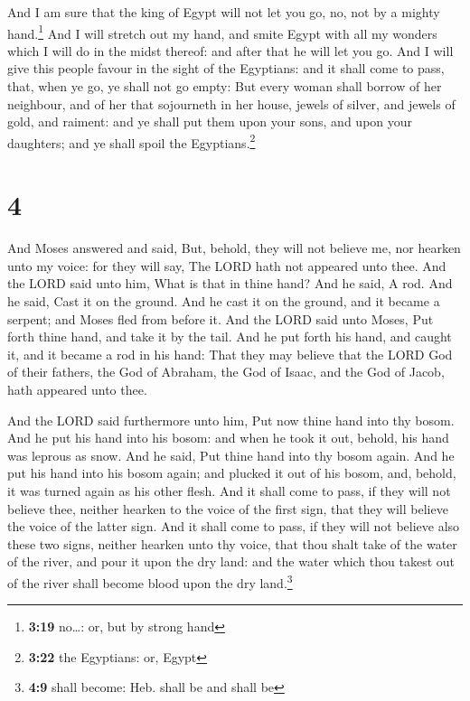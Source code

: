  And I am sure that the king of Egypt will not let you
go, no, not by a mighty hand.\footnote{\textbf{3:19} no\ldots: or, but
  by strong hand}  And I will stretch out my hand, and
smite Egypt with all my wonders which I will do in the midst thereof:
and after that he will let you go.  And I will give this
people favour in the sight of the Egyptians: and it shall come to pass,
that, when ye go, ye shall not go empty:  But every woman
shall borrow of her neighbour, and of her that sojourneth in her house,
jewels of silver, and jewels of gold, and raiment: and ye shall put them
upon your sons, and upon your daughters; and ye shall spoil the
Egyptians.\footnote{\textbf{3:22} the Egyptians: or, Egypt}

\hypertarget{section-3}{%
\section{4}\label{section-3}}

 And Moses answered and said, But, behold, they will not
believe me, nor hearken unto my voice: for they will say, The LORD hath
not appeared unto thee.  And the LORD said unto him, What
is that in thine hand? And he said, A rod.  And he said,
Cast it on the ground. And he cast it on the ground, and it became a
serpent; and Moses fled from before it.  And the LORD said
unto Moses, Put forth thine hand, and take it by the tail. And he put
forth his hand, and caught it, and it became a rod in his hand:
 That they may believe that the LORD God of their fathers,
the God of Abraham, the God of Isaac, and the God of Jacob, hath
appeared unto thee.

 And the LORD said furthermore unto him, Put now thine
hand into thy bosom. And he put his hand into his bosom: and when he
took it out, behold, his hand was leprous as snow.  And he
said, Put thine hand into thy bosom again. And he put his hand into his
bosom again; and plucked it out of his bosom, and, behold, it was turned
again as his other flesh.  And it shall come to pass, if
they will not believe thee, neither hearken to the voice of the first
sign, that they will believe the voice of the latter sign.
 And it shall come to pass, if they will not believe also
these two signs, neither hearken unto thy voice, that thou shalt take of
the water of the river, and pour it upon the dry land: and the water
which thou takest out of the river shall become blood upon the dry
land.\footnote{\textbf{4:9} shall become: Heb. shall be and shall be}

